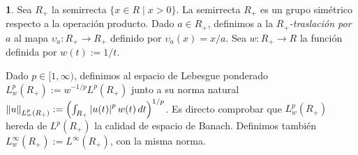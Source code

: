 \documentclass[10pt,a4paper]{report}
\newcommand{\abs}[2][y]{\if#1y\left\fi\lvert#2\if#1y\right\fi\rvert}
\newcommand{\norm}[2][y]{{\if#1y\left\fi\lVert#2\if#1y\right\fi\rVert}}
\newcommand{\dd}{\,d}
\newcommand{\Real}{R}
\theoremstyle{definition}
\newtheorem{problem}{\color{azul}{Problema}}
\numberwithin{equation}{problem}
\providecommand{\abs}[1]{\left\lvert#1\right\rvert}
\providecommand{\norm}[1]{\left\lVert#1\right\rVert}
\begin{document}
	\newcommand{\RP}{\Real_+}
	\begin{problem}
		Sea $\RP$ la semirrecta $\{ x \in \Real \mid x > 0 \}$.
		La semirrecta $\RP$ es un grupo simétrico respecto a la operación producto.
		Dado $a \in \RP$, definimos a la \emph{$\RP$-traslación por $a$} al mapa $\upsilon_a \colon \RP \to \RP$ definido por $\upsilon_a(x) = x/a$.
		Sea $w \colon \RP \to \Real$ la función definida por $w(t) := 1/t$.
		
		Dado $p \in [1,\infty)$, definimos al espacio de Lebesgue ponderado $L^p_w(\RP) := w^{-1/p} L^p(\RP)$ junto a su norma natural $\norm{u}_{L^p_w(\RP)} := \left( \int_{\RP} \abs{u(t)}^p w(t) \dd t\right)^{1/p}$.
		Es directo comprobar que $L^p_w(\RP)$ hereda de $L^p(\RP)$ la calidad de espacio de Banach.
		Definimos también $L^\infty_w(\RP) := L^\infty(\RP)$, con la misma norma.
		

\end{problem}
\end{document}
